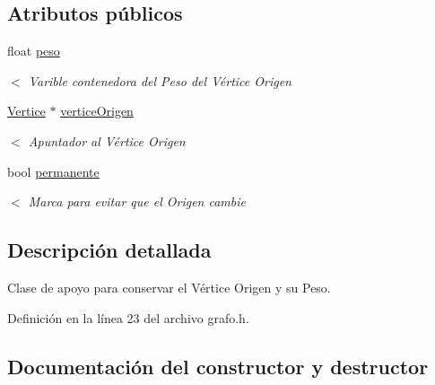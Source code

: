 \subsection*{Atributos públicos}
\begin{DoxyCompactItemize}
\item 
\mbox{\label{classEtiqueta_a6cb53a3db11a5f79617642d5a3b1a2fa}} 
float \hyperlink{classEtiqueta_a6cb53a3db11a5f79617642d5a3b1a2fa}{peso}
\begin{DoxyCompactList}\small\item\em $<$ Varible contenedora del Peso del Vértice Origen \end{DoxyCompactList}\item 
\mbox{\label{classEtiqueta_abbc7c11fe50bd7ae2a34949e10e66fff}} 
\hyperlink{classVertice}{Vertice} $\ast$ \hyperlink{classEtiqueta_abbc7c11fe50bd7ae2a34949e10e66fff}{vertice\+Origen}
\begin{DoxyCompactList}\small\item\em $<$ Apuntador al Vértice Origen \end{DoxyCompactList}\item 
\mbox{\label{classEtiqueta_aa69958b23c24051acace2d464be55de4}} 
bool \hyperlink{classEtiqueta_aa69958b23c24051acace2d464be55de4}{permanente}
\begin{DoxyCompactList}\small\item\em $<$ Marca para evitar que el Origen cambie \end{DoxyCompactList}\end{DoxyCompactItemize}


\subsection{Descripción detallada}
Clase de apoyo para conservar el Vértice Origen y su Peso. 

Definición en la línea 23 del archivo grafo.\+h.



\subsection{Documentación del constructor y destructor}
\mbox{\label{classEtiqueta_aa7f1cc55f5fed8f31cc176d375544349}} 

